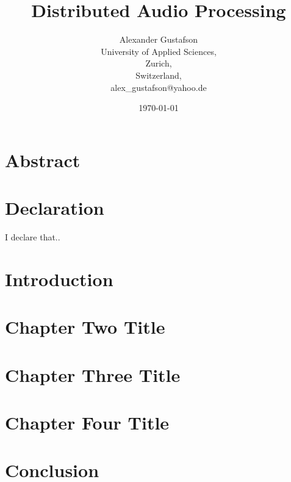 \documentclass{report}
\begin{document}
\title{Distributed Audio Processing}
\author{Alexander Gustafson\\
  University of Applied Sciences,\\
  Zurich,\\
  Switzerland,\\
  alex\_gustafson@yahoo.de}
\date{\today}
\maketitle

\chapter*{Abstract}


\chapter*{Declaration}
I declare that..

\tableofcontents

\chapter{Introduction}


\chapter{Chapter Two Title}


\chapter{Chapter Three Title}


\chapter{Chapter Four Title}


\chapter{Conclusion}


{}

\end{document}
